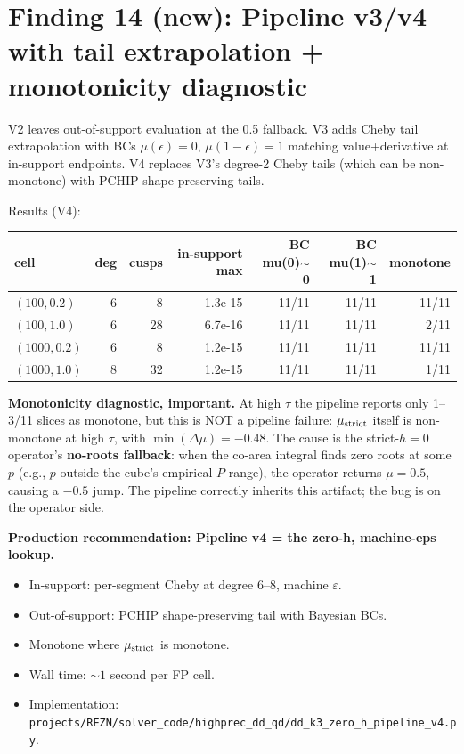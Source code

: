 \documentclass[11pt]{article}
\begin{document}
\section{Finding 14 (new): Pipeline v3/v4 with tail extrapolation + monotonicity diagnostic}

V2 leaves out-of-support evaluation at the 0.5 fallback. V3 adds Cheby
tail extrapolation with BCs $\mu(\epsilon) = 0$, $\mu(1-\epsilon) = 1$
matching value+derivative at in-support endpoints. V4 replaces V3's
degree-2 Cheby tails (which can be non-monotone) with PCHIP
shape-preserving tails.

Results (V4):

\begin{center}\begin{tabular}{lrrrrrr}\toprule
cell & deg & cusps & in-support max & BC mu(0)$\sim$0 & BC mu(1)$\sim$1 & monotone \\
\midrule
$(100, 0.2)$  & 6 & 8  & 1.3e-15 & 11/11 & 11/11 & 11/11 \\
$(100, 1.0)$  & 6 & 28 & 6.7e-16 & 11/11 & 11/11 & 2/11 \\
$(1000, 0.2)$ & 6 & 8  & 1.2e-15 & 11/11 & 11/11 & 11/11 \\
$(1000, 1.0)$ & 8 & 32 & 1.2e-15 & 11/11 & 11/11 & 1/11 \\
\bottomrule\end{tabular}\end{center}

\textbf{Monotonicity diagnostic, important.} At high $\tau$ the
pipeline reports only 1--3/11 slices as monotone, but this is NOT a
pipeline failure: $\mu_{\rm strict}$ itself is non-monotone at high $\tau$,
with $\min(\Delta\mu) = -0.48$. The cause is the strict-$h{=}0$
operator's \textbf{no-roots fallback}: when the co-area integral finds
zero roots at some $p$ (e.g., $p$ outside the cube's empirical
$P$-range), the operator returns $\mu = 0.5$, causing a $-0.5$ jump.
The pipeline correctly inherits this artifact; the bug is on the
operator side.

\textbf{Production recommendation: Pipeline v4 = the zero-h, machine-eps
lookup.}
\begin{itemize}\itemsep1pt
  \item In-support: per-segment Cheby at degree 6--8, machine $\varepsilon$.
  \item Out-of-support: PCHIP shape-preserving tail with Bayesian BCs.
  \item Monotone where $\mu_{\rm strict}$ is monotone.
  \item Wall time: $\sim 1$ second per FP cell.
  \item Implementation:
        \texttt{projects/REZN/solver\_code/highprec\_dd\_qd/dd\_k3\_zero\_h\_pipeline\_v4.py}.
\end{itemize}
\end{document}
